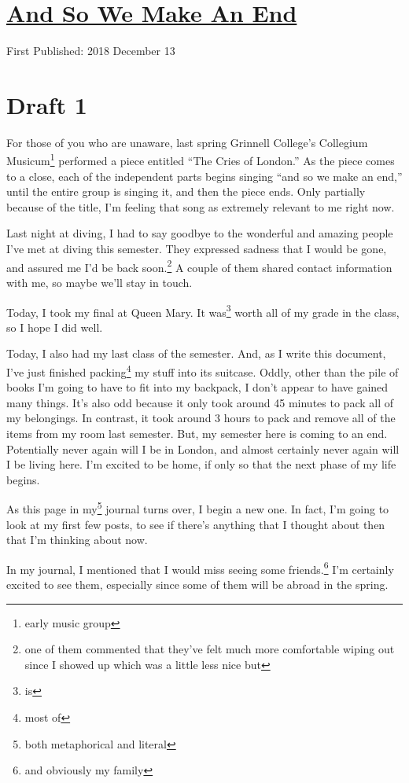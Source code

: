\documentclass[12pt]{article}[titlepage]
\newcommand{\say}[1]{``#1''}
\newcommand{\1}{\={a}}
\newcommand{\2}{\={e}}
\newcommand{\3}{\={\i}}
\newcommand{\4}{\=o}
\newcommand{\5}{\=u}
\newcommand{\6}{\={A}}
\renewcommand{\,}{\textsuperscript{,}}
\begin{document}
\doublespacing
\section{\href{and-so-we-make-an-end.html}{And So We Make An End}}
First Published: 2018 December 13
\section{Draft 1}
For those of you who are unaware, last spring Grinnell College's Collegium Musicum\footnote{early music group} performed a piece entitled \say{The Cries of London.}
As the piece comes to a close, each of the independent parts begins singing \say{and so we make an end,} until the entire group is singing it, and then the piece ends.
Only partially because of the title, I'm feeling that song as extremely relevant to me right now.

Last night at diving, I had to say goodbye to the wonderful and amazing people I've met at diving this semester.
They expressed sadness that I would be gone, and assured me I'd be back soon.\footnote{one of them commented that they've felt much more comfortable wiping out since I showed up which was a little less nice but}
A couple of them shared contact information with me, so maybe we'll stay in touch.

Today, I took my final at Queen Mary.
It was\footnote{is} worth all of my grade in the class, so I hope I did well.

Today, I also had my last class of the semester.
And, as I write this document, I've just finished packing\footnote{most of} my stuff into its suitcase.
Oddly, other than the pile of books I'm going to have to fit into my backpack, I don't appear to have gained many things.
It's also odd because it only took around 45 minutes to pack all of my belongings.
In contrast, it took around 3 hours to pack and remove all of the items from my room last semester.
But, my semester here is coming to an end.
Potentially never again will I be in London, and almost certainly never again will I be living here.
I'm excited to be home, if only so that the next phase of my life begins.

As this page in my\footnote{both metaphorical and literal} journal turns over, I begin a new one.
In fact, I'm going to look at my first few posts, to see if there's anything that I thought about then that I'm thinking about now.

In my journal, I mentioned that I would miss seeing some friends.\footnote{and obviously my family}
I'm certainly excited to see them, especially since some of them will be abroad in the spring.
\end{document}
